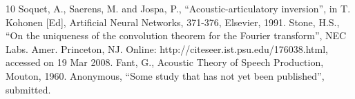 \documentclass[a4paper]{article}
\begin{document}
%
\eightpt

\begin{thebibliography}{10}
 Soquet, A., Saerens, M. and Jospa, P., ``Acoustic-articulatory
inversion'', in T. Kohonen [Ed], Artificial Neural Networks, 371-376,
Elsevier, 1991.
 Stone, H.S., ``On the uniqueness of the convolution theorem
for the Fourier transform'', NEC Labs. Amer. Princeton, NJ.
Online: http://citeseer.ist.psu.edu/176038.html, accessed on 19 Mar 2008.
 Fant, G., Acoustic Theory of Speech Production, Mouton, 1960.
 Anonymous, ``Some study that has not yet been published'', submitted.
\end{thebibliography}
\end{document}
